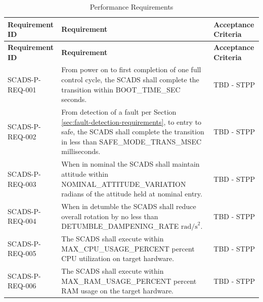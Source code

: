 \documentclass{article}
\begin{document}
        \renewcommand{\arraystretch}{1.4}
        \begin{longtable}{|l|p{9cm}|p{5cm}|}
            \caption{Performance Requirements} \\
                \hline
                \textbf{Requirement ID} & \textbf{Requirement} & 
                \textbf{Acceptance Criteria} \\ \hline
                \endfirsthead

                \hline
                \textbf{Requirement ID} & \textbf{Requirement} & 
                \textbf{Acceptance Criteria} \\ \hline
                \endhead
                \hline
                \endfoot
                SCADS-P-REQ-001 & From power on to first completion of one 
                                  full control cycle, the SCADS shall complete 
                                  the transition within BOOT\_TIME\_SEC seconds.
                                & TBD - STPP \\ \hline
                SCADS-P-REQ-002 & From detection of a fault per Section 
                                  \ref{sec:fault-detection-requirements}, to 
                                  entry to safe, the SCADS shall complete the 
                                  transition in less than SAFE\_MODE\_TRANS\_MSEC
                                  milliseconds.
                                & TBD - STPP \\ \hline
                SCADS-P-REQ-003 & When in nominal the SCADS shall maintain 
                                  attitude within NOMINAL\_ATTITUDE\_VARIATION
                                  radians of the attitude held at nominal entry.
                                & TBD - STPP \\ \hline
                SCADS-P-REQ-004 & When in detumble the SCADS shall reduce 
                                  overall rotation by no less than
                                  DETUMBLE\_DAMPENING\_RATE $\mathrm{rad/s}^2$.
                                & TBD - STPP \\ \hline
                SCADS-P-REQ-005 & The SCADS shall execute within MAX\_CPU\_USAGE\_PERCENT
                                  percent CPU utilization on target hardware. 
                                & TBD - STPP \\ \hline
                SCADS-P-REQ-006 & The SCADS shall execute within MAX\_RAM\_USAGE\_PERCENT
                                  percent RAM usage on the target hardware.
                                & TBD - STPP \\ \hline

\end{longtable}
\end{document}
